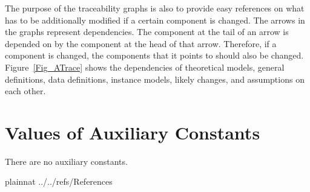 \documentclass[12pt]{article}
\begin{document}
The purpose of the traceability graphs is also to provide easy references on
what has to be additionally modified if a certain component is changed.  The
arrows in the graphs represent dependencies. The component at the tail of an
arrow is depended on by the component at the head of that arrow. Therefore, if a
component is changed, the components that it points to should also be
changed. Figure~\ref{Fig_ATrace} shows the dependencies of theoretical models,
general definitions, data definitions, instance models, likely changes, and
assumptions on each other. 




\section{Values of Auxiliary Constants}

There are no auxiliary constants.

\newpage

 {plainnat}
 {../../refs/References}


\newpage

\iffalse\noindent {}
\end{document}
